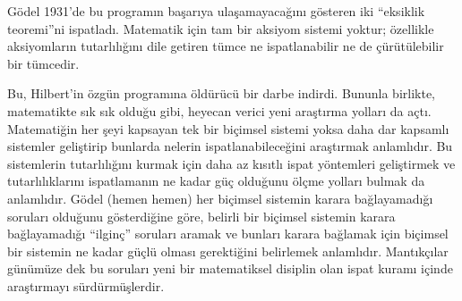 G\"odel 1931'de bu programın başarıya ulaşamayacağını gösteren iki
``eksiklik teoremi''ni ispatladı. Matematik için tam bir aksiyom sistemi
yoktur; özellikle aksiyomların tutarlılığını dile getiren tümce ne
ispatlanabilir ne de çürütülebilir bir tümcedir.

Bu, Hilbert'in özgün programına öldürücü bir darbe indirdi. Bununla birlikte,
matematikte sık sık olduğu gibi, heyecan verici yeni araştırma yolları da
açtı. Matematiğin her şeyi kapsayan tek bir biçimsel sistemi yoksa daha dar
kapsamlı sistemler geliştirip bunlarda nelerin ispatlanabileceğini
araştırmak anlamlıdır. Bu sistemlerin tutarlılığını kurmak için daha az
kısıtlı ispat yöntemleri geliştirmek ve tutarlılıklarını ispatlamanın ne
kadar güç olduğunu ölçme yolları bulmak da anlamlıdır. G\"odel (hemen
hemen) her biçimsel sistemin karara bağlayamadığı soruları olduğunu
gösterdiğine göre, belirli bir biçimsel sistemin karara bağlayamadığı
``ilginç'' soruları aramak ve bunları karara bağlamak için biçimsel bir
sistemin ne kadar güçlü olması gerektiğini belirlemek anlamlıdır.
Mantıkçılar günümüze dek bu soruları yeni bir matematiksel disiplin olan
ispat kuramı içinde araştırmayı sürdürmüşlerdir.

